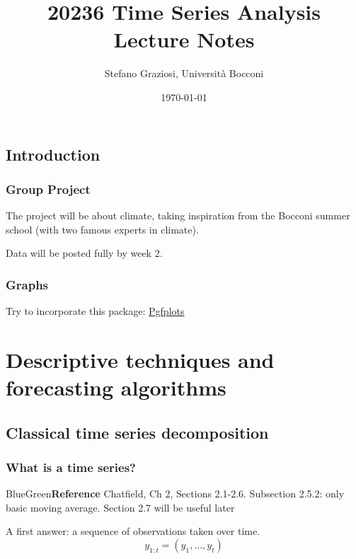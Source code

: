 \documentclass[dvipsnames,12pt]{book}
\title{20236 Time Series Analysis \\[1cm] \textbf{Lecture Notes}}
\author{Stefano Graziosi, Università Bocconi}
\date{\today}
\begin{document}
\maketitle

\tableofcontents

\chapter*{Introduction}

    \section*{Group Project}

        The project will be about climate, taking inspiration from the Bocconi summer school (with two famous experts in climate).

        \noindent Data will be posted fully by week 2.

    \section{Graphs}

        Try to incorporate this package: \href{https://www.overleaf.com/learn/latex/Pgfplots_package}{Pgfplots}


\part{Descriptive techniques and forecasting algorithms}

    \chapter{Classical time series decomposition}

            \section{What is a time series?}

                \begin{mybox}{BlueGreen}{\textbf{Reference}}
                    Chatfield, Ch 2, Sections 2.1-2.6. Subsection 2.5.2: only basic moving average. Section 2.7 will be useful later
                \end{mybox}

                A first answer: a sequence of observations taken over time.
                \begin{equation}
                    y_{1:t} = (y_1, \ldots, y_t)
                \end{equation}
\end{document}
